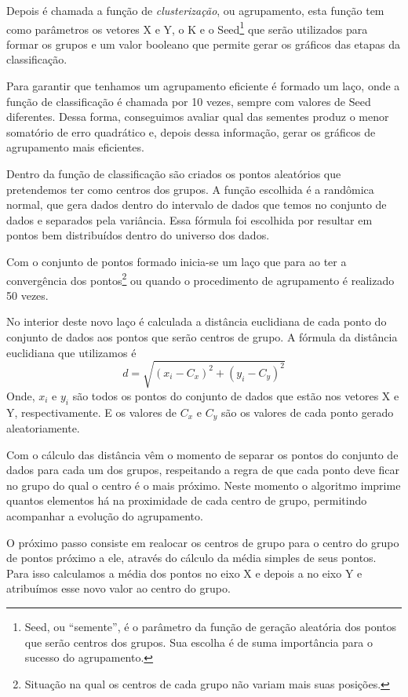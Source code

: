 \documentclass[12pt, a4paper]{article}
\begin{document}
Depois é chamada a função de \textit{clusterização}, ou agrupamento, esta função tem como parâmetros os vetores X e Y, o K e o Seed\footnote{Seed, ou ``semente'', é o parâmetro da função de geração aleatória dos pontos que serão centros dos grupos. Sua escolha é de suma importância para o sucesso do agrupamento.} que serão utilizados para formar os grupos e um valor booleano que permite gerar os gráficos das etapas da classificação.

Para garantir que tenhamos um agrupamento eficiente é formado um laço, onde a função de classificação é chamada por 10 vezes, sempre com valores de Seed diferentes. Dessa forma, conseguimos avaliar qual das sementes produz o menor somatório de erro quadrático e, depois dessa informação, gerar os gráficos de agrupamento mais eficientes.

Dentro da função de classificação são criados os pontos aleatórios que pretendemos ter como centros dos grupos. A função escolhida é a randômica normal, que gera dados dentro do intervalo de dados que temos no conjunto de dados e separados pela variância. Essa fórmula foi escolhida por resultar em pontos bem distribuídos dentro do universo dos dados.

Com o conjunto de pontos formado inicia-se um laço que para ao ter a convergência dos pontos\footnote{Situação na qual os centros de cada grupo não variam mais suas posições.} ou quando o procedimento de agrupamento é realizado 50 vezes.

No interior deste novo laço é calculada a distância euclidiana de cada ponto do conjunto de dados aos pontos que serão centros de grupo. A fórmula da distância euclidiana que utilizamos é $$d = \sqrt{(x_i - C_x)^2+(y_i - C_y)^2}$$ Onde, $x_i$ e $y_i$ são todos os pontos do conjunto de dados que estão nos vetores X e Y, respectivamente. E os valores de $C_x$ e $C_y$ são os valores de cada ponto gerado aleatoriamente.

Com o cálculo das distância vêm o momento de separar os pontos do conjunto de dados para cada um dos grupos, respeitando a regra de que cada ponto deve ficar no grupo do qual o centro é o mais próximo. Neste momento o algoritmo imprime quantos elementos há na proximidade de cada centro de grupo, permitindo acompanhar a evolução do agrupamento.

O próximo passo consiste em realocar os centros de grupo para o centro do grupo de pontos próximo a ele, através do cálculo da média simples de seus pontos. Para isso calculamos a média dos pontos no eixo X e depois a no eixo Y e atribuímos esse novo valor ao centro do grupo.
\end{document}
